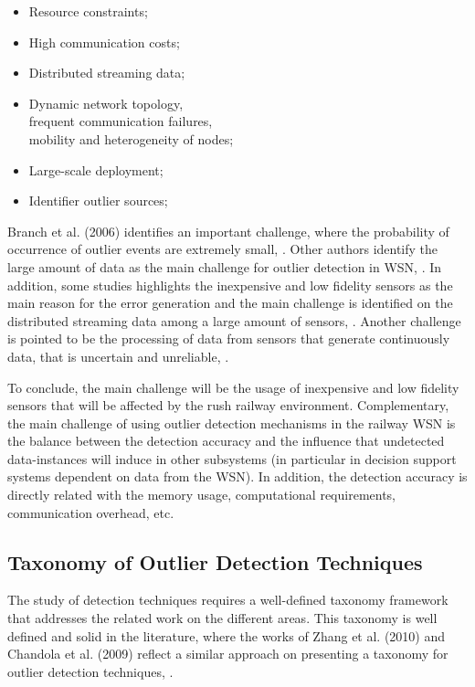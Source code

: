 \begin{itemize}
	\setlength\itemsep{-0.5em}
	
	\item Resource constraints;
	
	\item High communication costs;
	
	\item Distributed streaming data;
	
	\item Dynamic network topology, \\ frequent communication failures, \\ mobility and heterogeneity of nodes;
	
	\item Large-scale deployment;
	
	\item Identifier outlier sources;
	
\end{itemize}

Branch et al. (2006)  identifies an important challenge, where the probability of occurrence of outlier events are extremely small, \cite{class:branch:2006}. Other authors identify the large amount of data as the main challenge for outlier detection in WSN, \cite{nn:abid:2016, stat:sheng:2007}. In addition, some studies highlights the inexpensive and low fidelity sensors as the main reason for the error generation and the main challenge is identified on the distributed streaming data among a large amount of sensors, \cite{nn:zhuang:2006}. Another challenge is pointed to be  the processing of data from sensors that generate continuously data, that is uncertain and unreliable, \cite{stat:ghorbel:2015}. 

To conclude, the main challenge will be the usage of inexpensive and low fidelity sensors that will be affected by the rush railway environment. Complementary, the main challenge of using outlier detection mechanisms in the railway \ac{WSN} is the balance between the detection accuracy and the influence that undetected data-instances will induce in other subsystems (in particular in decision support systems dependent on data from the \ac{WSN}). In addition, the detection accuracy is directly related with the memory usage, computational requirements, communication overhead, etc. 


\subsection{Taxonomy of Outlier Detection Techniques}
\label{sec:taxon}
The study of detection techniques requires a well-defined taxonomy framework that addresses the related work on the different areas. 
This taxonomy is well defined and solid in the literature, where the works of Zhang et al. (2010) and Chandola et al. (2009) reflect a similar approach on presenting a taxonomy for outlier detection techniques, \cite{gen:zhang:2010, gen:chandola:2009}.

